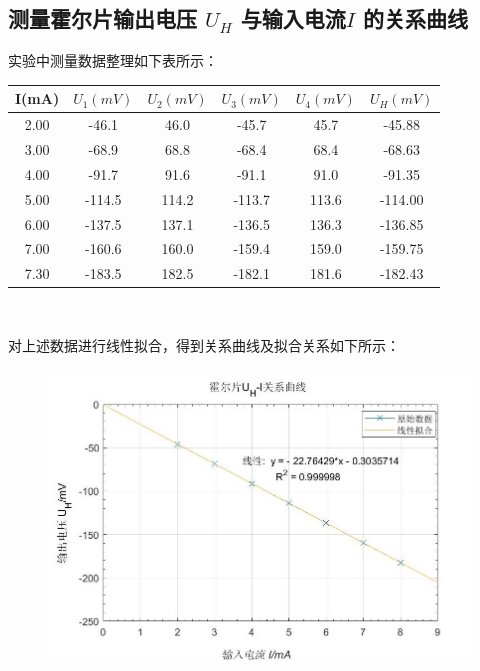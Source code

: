 \documentclass[UTF8]{ctexart}
\begin{document}
\subsection{测量霍尔片输出电压 $U_H$ 与输入电流$I$ 的关系曲线}

实验中测量数据整理如下表所示：

\begin{center}
\begin{tabular}{c|c|c|c|c|c}
  \hline I(mA) & $U_1(mV)$ & $U_2(mV)$ & $U_3(mV) $ & $U_4(mV)$ &$U_H(mV)$ \\
  \hline 2.00  & -46.1  & 46.0  & -45.7  & 45.7  & -45.88       \\
  \hline 3.00  & -68.9  & 68.8  & -68.4  & 68.4  & -68.63       \\
  \hline 4.00  & -91.7  & 91.6  & -91.1  & 91.0  & -91.35       \\
  \hline 5.00  & -114.5  & 114.2  & -113.7  & 113.6  & -114.00  \\
  \hline 6.00  & -137.5  & 137.1  & -136.5  & 136.3  & -136.85  \\
  \hline 7.00  & -160.6  & 160.0  & -159.4  & 159.0  & -159.75  \\
  \hline 7.30  & -183.5  & 182.5  & -182.1  & 181.6  & -182.43  \\
  \hline
\end{tabular}\\
\end{center}

对上述数据进行线性拟合，得到关系曲线及拟合关系如下所示：
\begin{figure}[H]
  \centering
  \includegraphics[scale=0.7]{拟合1.jpg}
\end{figure}
\end{document}
